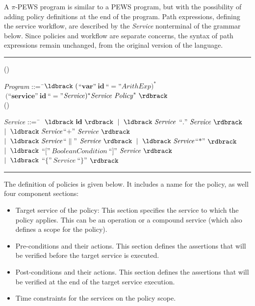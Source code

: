 \documentclass{sig-alternate}
\newcounter{regraB}
\newcommand{\reg}{(\theregraB) \addtocounter{regraB}{1}}
\begin{document}
A $\pi$-PEWS program is similar to a PEWS program, but with the possibility of adding policy definitions at the end of the program.
Path expressions, defining the service workflow, are described by the \textit{Service} nonterminal of the grammar below. 
Since policies and workflow are separate concerns, the syntax of path expressions remain unchanged, from the original version of the language.\\
\hrule
\begin{tabbing}
\reg \textit{Program} ::=\=  \ $\ldbrack\ ($``$\mathbf{var}$''$\ \mathbf{id}\
$``$=$''$ \mathit{ArithExp} )^* $\\ \>$ \ ($``$\mathbf{service}$''$\
\mathbf{id}\ $``$=$''$ \mathit{Service})^* \mathit{Service}\ \mathit{Policy}^ *\
\rdbrack$\\[1.5mm] \reg \textit{Service} ::=\=  \ $\ 	\ \ldbrack\  \mathbf{id} \ \rdbrack\ \mid\ \ldbrack\ \mathit{Service}\
                                              $``$.$''$\ \mathit{Service} \ \rdbrack\ $\\ \>$
                                              \mid\ \ldbrack\ \mathit{Service} $``$+$''$\ \mathit{Service} \ \rdbrack\ $\\ \>$
                                              \mid\ \ldbrack\  \mathit{Service} $``$\|$''$\ \mathit{Service} \ \rdbrack\ 
                                              \mid\ \ldbrack\  \mathit{Service}$``$*$''$\ \rdbrack\ $\\ \>$
                                              \mid \ \ldbrack\ $``$[$''$\
                                              \mathit{BooleanCondition}\ $``$]$''$ \ \mathit{Service} \ \rdbrack\ $\\ \>$
                                              \mid\ \ldbrack\ $``$\{$''$\  \mathit{Service}\ $``$\}$''$\ \rdbrack\ $ \\[-3mm]
\end{tabbing}
\hrule
\vspace*{2mm}

The definition of policies is given below. 
It includes a name for the policy, as well four component sections:
\begin{itemize}
\item Target service of the policy: This section specifies the service to which the policy applies. This can be an operation or a compound service (which also defines a scope for the policy).
\item Pre-conditions and their actions. This section defines the assertions that will be verified before the target service is executed. 
\item Post-conditions and their actions. This section defines the assertions that will be verified at the end of the target service execution. 
\item Time constraints for the services on the policy scope.
\end{itemize} 
\end{document}
